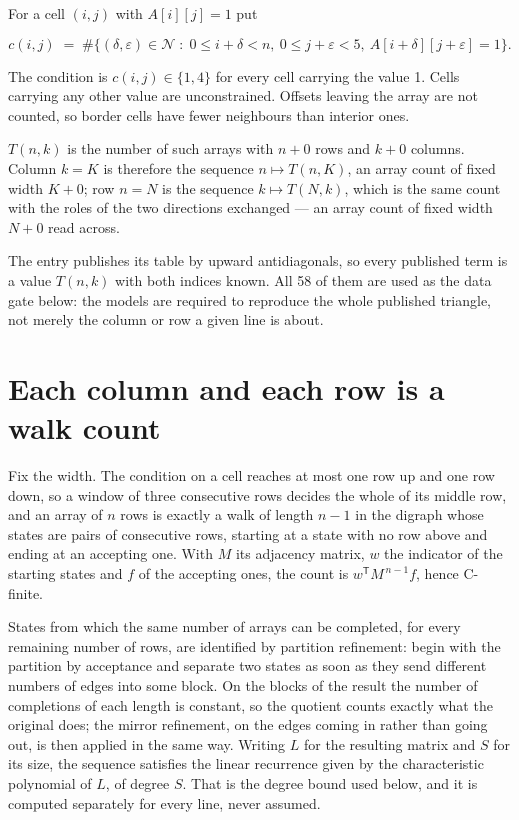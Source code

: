 \documentclass[11pt]{article}
\theoremstyle{definition}
\begin{document}
For a cell $(i,j)$ with $A[i][j] = 1$ put

\[c(i,j) \;=\; \#\bigl\{(\delta,\varepsilon)\in\mathcal{N} \;:\; 0\le i+\delta<n,\ 0\le j+\varepsilon<5,\ A[i+\delta][j+\varepsilon] = 1\bigr\}.\]

The condition is $c(i,j) \in \{1, 4\}$ for every cell carrying the value 1. Cells carrying any other value are unconstrained. Offsets leaving the array are not counted, so border cells have fewer neighbours than interior ones.

$T(n,k)$ is the number of such arrays with $n + 0$ rows and $k + 0$ columns. Column $k = K$ is therefore the sequence $n \mapsto T(n,K)$, an array count of fixed width $K + 0$; row $n = N$ is the sequence $k \mapsto T(N,k)$, which is the same count with the roles of the two directions exchanged --- an array count of fixed width $N + 0$ read across.

The entry publishes its table by upward antidiagonals, so every published term is a value $T(n,k)$ with both indices known. All 58 of them are used as the data gate below: the models are required to reproduce the whole published triangle, not merely the column or row a given line is about.

\section{Each column and each row is a walk count}

Fix the width. The condition on a cell reaches at most one row up and one row down, so a window of three consecutive rows decides the whole of its middle row, and an array of $n$ rows is exactly a walk of length $n-1$ in the digraph whose states are pairs of consecutive rows, starting at a state with no row above and ending at an accepting one. With $M$ its adjacency matrix, $w$ the indicator of the starting states and $f$ of the accepting ones, the count is $w^{\mathsf T}M^{\,n-1}f$, hence C-finite.

States from which the same number of arrays can be completed, for every remaining number of rows, are identified by partition refinement: begin with the partition by acceptance and separate two states as soon as they send different numbers of edges into some block. On the blocks of the result the number of completions of each length is constant, so the quotient counts exactly what the original does; the mirror refinement, on the edges coming in rather than going out, is then applied in the same way. Writing $L$ for the resulting matrix and $S$ for its size, the sequence satisfies the linear recurrence given by the characteristic polynomial of $L$, of degree $S$. That is the degree bound used below, and it is computed separately for every line, never assumed.
\end{document}
